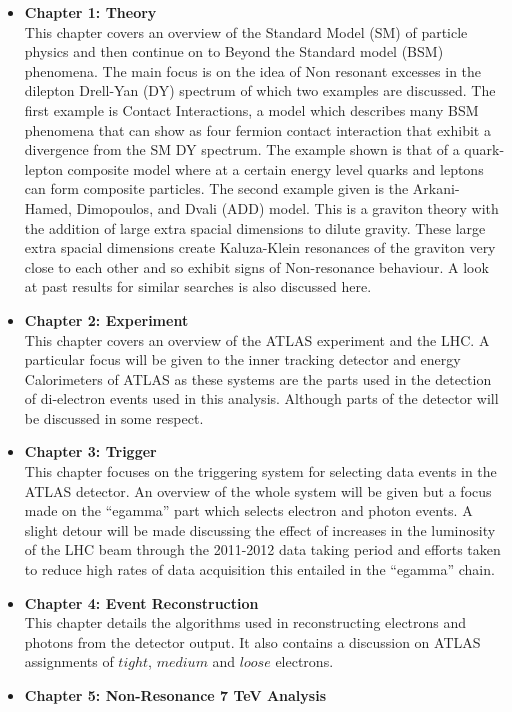 \begin{itemize}
\item{ 
{\bf Chapter 1: Theory} \\
This chapter covers an overview of the Standard Model (SM) of particle physics and then continue on to Beyond the Standard model (BSM) phenomena. The main focus is on the idea of Non resonant excesses in the dilepton Drell-Yan (DY) spectrum of which two examples are discussed. The first example is Contact Interactions, a model which describes many BSM phenomena that can show as four fermion contact interaction that exhibit a divergence from the SM DY spectrum. The example shown is that of a quark-lepton composite model where at a certain energy level quarks and leptons can form composite particles. The second example given is the Arkani-Hamed, Dimopoulos, and Dvali (ADD) model. This is a graviton theory with the addition of large extra spacial dimensions to dilute gravity. These large extra spacial dimensions create Kaluza-Klein resonances of the graviton very close to each other and so exhibit signs of Non-resonance behaviour. A look at past results for similar searches is also discussed here.
}
\item{ 
{\bf Chapter 2: Experiment} \\
This chapter covers an overview of the ATLAS experiment and the LHC. A particular focus will be given to the inner tracking detector and energy Calorimeters of ATLAS as these systems are the parts used in the detection of di-electron events used in this analysis. Although parts of the detector will be discussed in some respect.
}
\item{ 
{\bf Chapter 3: Trigger} \\
This chapter focuses on the triggering system for selecting data events in the ATLAS detector. An overview of the whole system will be given but a focus made on the ``egamma'' part which selects electron and photon events. A slight detour will be made discussing the effect of increases in the luminosity of the LHC beam through the 2011-2012 data taking period and efforts taken to reduce high rates of data acquisition this entailed in the ``egamma'' chain.
}
\item{ 
{\bf Chapter 4: Event Reconstruction} \\
This chapter details the algorithms used in reconstructing electrons and photons from the detector output. It also contains a discussion on ATLAS assignments of $tight$, $medium$ and $loose$ electrons.
}
\item{ 
{\bf Chapter 5: Non-Resonance 7 TeV Analysis} \\
}
\end{itemize}
